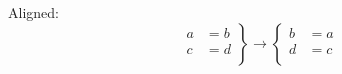\documentclass[a4paper]{article}
\begin{document}
	Aligned:
	\[
	\left.\begin{aligned}
		a &= b \\
		c &= d \\
	\end{aligned}\right\}
	\longrightarrow
	\left\{\begin{aligned}
		b &= a \\
		d &= c \\
	\end{aligned}\right.
	\]
\end{document}
